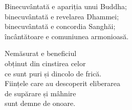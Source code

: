 Binecuvântată e apariția unui Buddha;\\
binecuvântată e revelarea Dhammei;\\
binecuvântată e concordia Sanghăi;\\
încântătoare e comuniunea armonioasă.


Nemăsurat e beneficiul\\
obținut din cinstirea celor\\
ce sunt puri și dincolo de frică.\\
Ființele care au descoperit eliberarea\\
de supărare și mâhnire\\
sunt demne de onoare.
